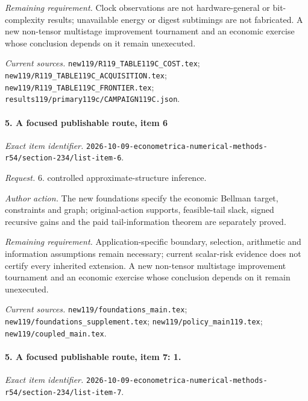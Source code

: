 \par\emph{Remaining requirement.} Clock observations are not hardware-general or bit-complexity results; unavailable energy or digest subtimings are not fabricated. A new non-tensor multistage improvement tournament and an economic exercise whose conclusion depends on it remain unexecuted.

\par\emph{Current sources.} \nolinkurl{new119/R119_TABLE119C_COST.tex}; \nolinkurl{new119/R119_TABLE119C_ACQUISITION.tex}; \nolinkurl{new119/R119_TABLE119C_FRONTIER.tex}; \nolinkurl{results119/primary119c/CAMPAIGN119C.json}.

\paragraph{5. A focused publishable route, item 6}

\emph{Exact item identifier.} \nolinkurl{2026-10-09-econometrica-numerical-methods-r54/section-234/list-item-6}.

\par\emph{Request.} 6. controlled approximate-structure inference.

\par\emph{Author action.} The new foundations specify the economic Bellman target, constraints and graph; original-action supports, feasible-tail slack, signed recursive gains and the paid tail-information theorem are separately proved.

\par\emph{Remaining requirement.} Application-specific boundary, selection, arithmetic and information assumptions remain necessary; current scalar-risk evidence does not certify every inherited extension. A new non-tensor multistage improvement tournament and an economic exercise whose conclusion depends on it remain unexecuted.

\par\emph{Current sources.} \nolinkurl{new119/foundations_main.tex}; \nolinkurl{new119/foundations_supplement.tex}; \nolinkurl{new119/policy_main119.tex}; \nolinkurl{new119/coupled_main.tex}.

\paragraph{5. A focused publishable route, item 7: 1.}

\emph{Exact item identifier.} \nolinkurl{2026-10-09-econometrica-numerical-methods-r54/section-234/list-item-7}.


